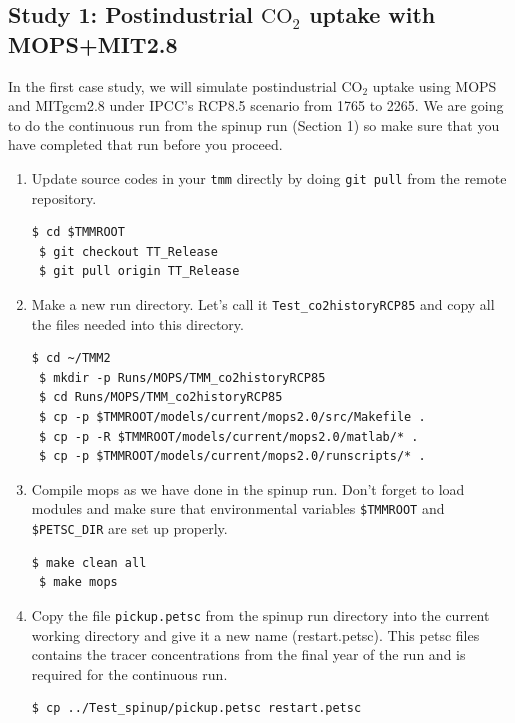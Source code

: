 \documentclass[a4paper]{article}
\def\noin{\noindent }
\begin{document}
\subsection{Study 1: Postindustrial $\mathrm{CO_{2}}$ uptake with MOPS+MIT2.8}
\noin In the first case study, we will simulate postindustrial $\mathrm{CO_{2}}$ uptake using MOPS and MITgcm2.8 under IPCC's RCP8.5 scenario from 1765 to 2265. We are going to do the continuous run from the spinup run (Section 1) so make sure that you have completed that run before you proceed.
\begin{enumerate}

\item Update source codes in your \verb|tmm| directly by doing \verb|git pull| from the remote repository.
\begin{lstlisting}[style=DOS]
 $ cd $TMMROOT
 $ git checkout TT_Release
 $ git pull origin TT_Release
\end{lstlisting}

\item Make a new run directory. Let's call it \verb|Test_co2historyRCP85| and copy all the files needed into this directory.
\begin{lstlisting}[style=DOS]
 $ cd ~/TMM2
 $ mkdir -p Runs/MOPS/TMM_co2historyRCP85
 $ cd Runs/MOPS/TMM_co2historyRCP85
 $ cp -p $TMMROOT/models/current/mops2.0/src/Makefile .
 $ cp -p -R $TMMROOT/models/current/mops2.0/matlab/* .
 $ cp -p $TMMROOT/models/current/mops2.0/runscripts/* .
\end{lstlisting}

\item Compile mops as we have done in the spinup run. Don't forget to load modules and make sure that environmental variables \verb|$TMMROOT| and \verb|$PETSC_DIR| are set up properly.
\begin{lstlisting}[style=DOS]
 $ make clean all
 $ make mops
\end{lstlisting}

\item Copy the file \verb|pickup.petsc| from the spinup run directory into the current working directory and give it a new name (restart.petsc). This petsc files contains the tracer concentrations from the final year of the run and is required for the continuous run.

\begin{lstlisting}[style=DOS]
 $ cp ../Test_spinup/pickup.petsc restart.petsc
\end{lstlisting}


\end{enumerate}
\end{document}
